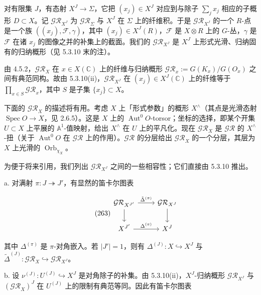  对有限集 $J$，有态射 $X^{J}\to\Sigma$，它把 $(x_j)\in X^{J}$ 对应到与除子 $\sum_j x_j$ 相应的子概形 $D\subset X$。记 $\mathcal{GR}_{X^{J}}$ 为 $\mathcal{GR}_\Sigma$ 与 $X^{J}$ 在 $\Sigma$ 上的纤维积。于是 $\mathcal{GR}_{X^{J}}$ 的一个 $R$-点是一个族 $((x_j),\mathcal{F},\gamma)$，其中 $(x_j)\in X^{J}(R)$，$\mathcal{F}$ 是 $X\otimes R$ 上的 $G$-丛，$\gamma$ 是 $\mathcal{F}$ 在诸 $x_j$ 的图像之并的补集上的截面。我们的 $\mathcal{GR}_{X^{J}}$ 是 $X^{J}$ 上形式光滑、归纳固有的归纳概形（见 5.3.10 末的注）。

由 4.5.2，$\mathcal{GR}_X$ 在 $x\in X(\mathbb{C})$ 上的纤维与归纳概形 $\mathcal{GR}_x:=G(K_x)/G(O_x)$ 之间有典范同构。故由 5.3.10(ii)，$\mathcal{GR}_{X^{J}}$ 在 $(x_j)\in X^{J}(\mathbb{C})$ 上的纤维等于 $\prod_{x\in S}\mathcal{GR}_x$，其中 $S$ 是子集 $\{x_j\}\subset X$。

下面的 $\mathcal{GR}_X$ 的描述将有用。考虑 $X$ 上「形式参数」的概形 $X^{\wedge}$（其点是光滑态射 $\operatorname{Spec}O\to X$，见 2.6.5）。这是 $X$ 上的 $\operatorname{Aut}^{0}O$-torsor；坐标的选择，即某个开集 $U\subset X$ 上平展的 $\mathbb{A}^{1}$-值映射，给出 $X^{\wedge}$ 在 $U$ 上的平凡化。现在 $\mathcal{GR}_X$ 是 $\mathcal{GR}$ 的 $X^{\wedge}$-扭（关于 $\operatorname{Aut}^{0}O$ 在 $\mathcal{GR}$ 上的作用）。$\mathcal{GR}$ 的分层给出 $\mathcal{GR}_X$ 的一个分层，其层为 $X$ 上光滑的 $\operatorname{Orb}_{\chi_X}$。

 为便于将来引用，我们列出 $\mathcal{GR}_{X^{J}}$ 之间的一些相容性；它们直接由 5.3.10 推出。

a. 对满射 $\pi:J\twoheadrightarrow J'$，有显然的笛卡尔图表

\begin{equation}\tag{263}
\begin{tikzcd}
\mathcal{GR}_{X^{J'}} \arrow[r,"\tilde\Delta^{(\pi)}"] \arrow[d] & \mathcal{GR}_{X^{J}} \arrow[d]\\
X^{J'} \arrow[r,"\Delta^{(\pi)}"] & X^{J}
\end{tikzcd}
\end{equation}


其中 $\Delta^{(\pi)}$ 是 $\pi$-对角嵌入。若 $|J'|=1$，则有 $\Delta^{(J)}:X\hookrightarrow X^{J}$ 与 $\tilde\Delta^{(J)}:\mathcal{GR}_X\hookrightarrow\mathcal{GR}_{X^{J}}$。

b. 设 $\nu^{(J)}:U^{(J)}\hookrightarrow X^{J}$ 是对角除子的补集。由 5.3.10(ii)，$X^{J}$-归纳概形 $\mathcal{GR}_{X^{J}}$ 与 $(\mathcal{GR}_X)^{J}$ 在 $U^{(J)}$ 上的限制有典范等同。因此有笛卡尔图表

